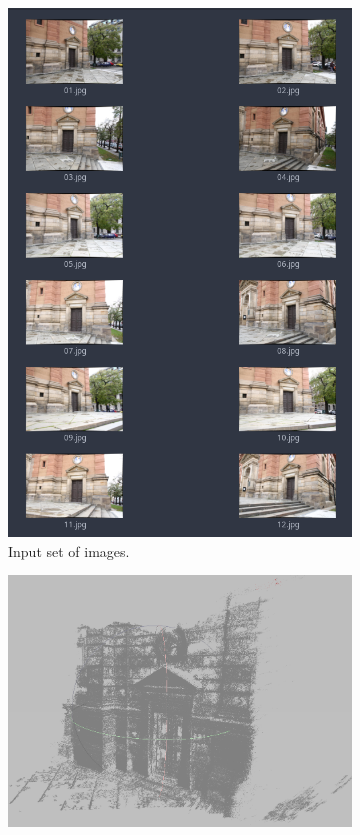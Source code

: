 \begin{figure}[h]
    \begin{subfigure}[b]{0.31\textwidth}
      \includegraphics[width=\textwidth]{graphics/input_set.png}
      \caption{Input set of images.}
      \label{fig:pc_input}
    \end{subfigure}
    \hfill
    \begin{subfigure}[b]{0.65\textwidth}
      \includegraphics[width=\textwidth]{graphics/reconstructed.png}

\end{subfigure}
\end{figure}
